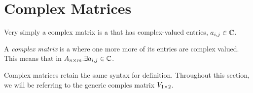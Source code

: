 \section{Complex Matrices}\label{sec:Complex_Matrices}
Very simply a complex matrix is a  that has complex-valued entries, $a_{i, j} \in \operatorname{\mathbb{C}}$.

\begin{definition}\label{def:Complex_Matrix}
  A \emph{complex matrix} is a  where one more more of its entries are complex valued.
  This means that in $A_{n \times m} . \exists a_{i, j} \in \operatorname{\mathbb{C}}$.
\end{definition}
Complex matrices retain the same syntax for definition.
Throughout this section, we will be referring to the generic comples matrix $V_{1 \times 2}$.











